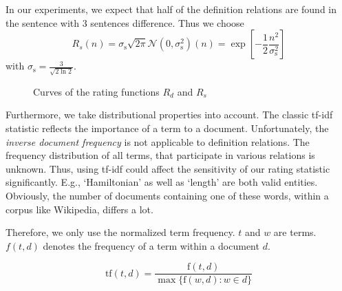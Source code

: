 \documentclass[runningheads]{llncs}
\begin{document}
In our experiments, we expect that half of the definition relations are found in the sentence with 3 sentences difference. Thus we choose 
\begin{equation}
\label{eq:order}
R_{s}(n)={\sigma_\mathrm{s} \sqrt{2\pi}} \mathcal N(0,\sigma_\mathrm{s}^2)(n)= \exp\left[-\frac{1}{2}\frac{n^2}{\sigma_\mathrm{s}^2}\right]
\end{equation}
 with $\sigma_\mathrm{s}=\frac{3}{\sqrt{2\ln 2}}$. 
\newcommand{\normalPlotFWHMII}[2]{(e^((-1/2)*(((#1)^2*2*ln(2))/(#2)^2)))}

\begin{figure}[H]
\caption{Curves of the rating functions $R_{d}$ and $R_{s}$}
\end{figure}

Furthermore, we take distributional properties into account. The classic tf-idf \cite{Salton86} statistic reflects the importance of a term to a document. Unfortunately, the \emph{inverse document frequency} is not applicable to definition relations. The frequency distribution of all terms, that participate in various relations is unknown. Thus, using tf-idf could affect the sensitivity of our rating statistic significantly. E.g., `Hamiltonian' as well as `length' are both valid entities. Obviously, the number of documents containing one of these words, within a corpus like Wikipedia, differs a lot.

Therefore, we only use the normalized term frequency. $t$ and $w$ are terms. $f(t,d)$ denotes the frequency of a term within a document $d$.

\begin{equation}
	\label{eq:tf}
	\mathrm{tf}(t,d) = \frac{\mathrm{f}(t,d)}{\max\{\mathrm{f}(w,d):w \in d\}}
\end{equation}
\end{document}
